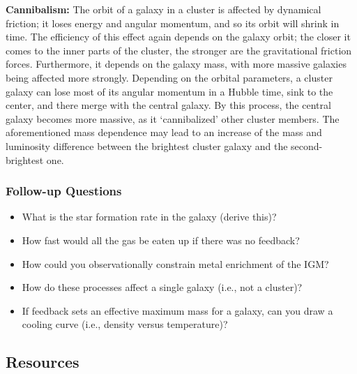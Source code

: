 \documentclass[a4paper,10pt]{article}
\begin{document}
{\noindent}\textbf{Cannibalism:} The orbit of a galaxy in a cluster is affected by dynamical friction; it loses energy and angular momentum, and so its orbit will shrink in time. The efficiency of this effect again depends on the galaxy orbit; the closer it comes to the inner parts of the cluster, the stronger are the gravitational friction forces. Furthermore, it depends on the galaxy mass, with more massive galaxies being affected more strongly. Depending on the orbital parameters, a cluster galaxy can lose most of its angular momentum in a Hubble time, sink to the center, and there merge with the central galaxy. By this process, the central galaxy becomes more massive, as it `cannibalized' other cluster members. The aforementioned mass dependence may lead to an increase of the mass and luminosity difference between the brightest cluster galaxy and the second-brightest one.


\newpage
\subsubsection{Follow-up Questions}

\begin{itemize}
    \item What is the star formation rate in the galaxy (derive this)? 
    \item How fast would all the gas be eaten up if there was no feedback?
    \item How could you observationally constrain metal enrichment of the IGM?
    \item How do these processes affect a single galaxy (i.e., not a cluster)?
    \item If feedback sets an effective maximum mass for a galaxy, can you draw a cooling curve (i.e., density versus temperature)? 
\end{itemize}


\newpage
\subsection{Resources}
\end{document}
